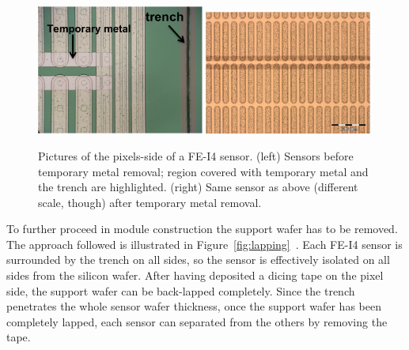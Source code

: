 \begin{figure}[!htpb]
\centering
\includegraphics[width=0.49\textwidth]{annotated_temporarymetal.png}
\includegraphics[width=0.49\textwidth]{notemporarymetal-izm.png}
\caption{Pictures of the pixels-side of a FE-I4 sensor. (left) Sensors before temporary metal removal; region covered with temporary metal and the trench are highlighted. (right)
Same sensor as above (different scale, though)  after temporary metal removal.}
\label{fig:tempmetal}
\end{figure}

To further proceed in module construction  the support wafer has to be removed. The approach followed is illustrated in Figure~\ref{fig:lapping}~\cite{Bomben:2013vua}. Each FE-I4 sensor is
surrounded by the trench on all sides, so  the sensor is effectively isolated  on all sides from the silicon wafer.
After having deposited a dicing tape on the pixel side, the support wafer can be back-lapped completely. Since the trench penetrates  the whole sensor wafer thickness,
once the support wafer has been completely lapped, each sensor can separated from the others by removing the tape.


